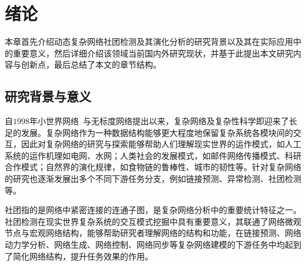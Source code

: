 
\baselineskip 20pt

\chapter{绪论}
\label{chap:1}

本章首先介绍动态复杂网络社团检测及其演化分析的研究背景以及其在实际应用中的重要意义，然后详细介绍该领域当前国内外研究现状，并基于此提出本文研究内容与创新点，最后总结了本文的章节结构。
 


\section{研究背景与意义}




自$1998$年小世界网络~\cite{watts1998collective}与无标度网络\cite{albert1999diameter}提出以来，复杂网络及复杂性科学即迎来了长足的发展。复杂网络作为一种数据结构能够更大程度地保留复杂系统各模块间的交互，因此对复杂网络的研究与探索能够帮助人们理解现实世界的运作模式，如人工系统的运作机理如电网\cite{mets2014combining}、水网\cite{bodini2002towards}；人类社会的发展模式，如邮件网络传播模式\cite{barnes2024temporal}、科研合作模式\cite{mariani2024collective}；自然界的演化规律，如食物链的鲁棒性\cite{dunne2002food}、城市的韧性\cite{zhang2018review}等。针对复杂网络的研究也逐渐发展出多个不同下游任务分支，例如链接预测\cite{zhu2016scalable}、异常检测\cite{ahmed2016survey}、社团检测等\cite{kumar2024community}。


社团指的是网络中紧密连接的连通子图，是复杂网络分析中的重要统计特征之一。社团检测在现实世界复杂系统的交互模式挖掘中具有重要意义，其联通了网络微观节点与宏观网络结构，能够帮助研究者理解网络的结构和功能，在链接预测、网络动力学分析、网络生成、网络控制、网络同步等复杂网络建模的下游任务中均起到了简化网络结构，提升任务效果的作用\cite{kumar2024community,fortunato2016community}。


